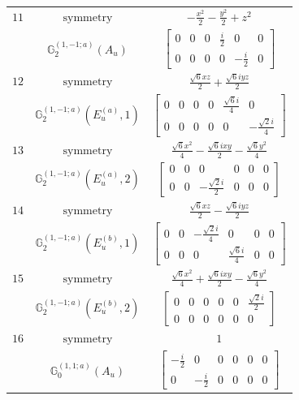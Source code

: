 \documentclass[fleqn,8pt,landscape]{jsarticle}
\begin{document}
\begin{longtable}{ccc}
$ 11 $ & $ \text{symmetry} $ & $ - \frac{x^{2}}{2} - \frac{y^{2}}{2} + z^{2} $ \\
$  $ & $ \mathbb{G}_{2}^{(1,-1;a)}(A_{u}) $ & $ \begin{bmatrix} 0 & 0 & 0 & \frac{i}{2} & 0 & 0 \\ 0 & 0 & 0 & 0 & - \frac{i}{2} & 0 \end{bmatrix} $ \\ \hline
$ 12 $ & $ \text{symmetry} $ & $ \frac{\sqrt{6} x z}{2} + \frac{\sqrt{6} i y z}{2} $ \\
$  $ & $ \mathbb{G}_{2}^{(1,-1;a)}(E_{u}^{(a)},1) $ & $ \begin{bmatrix} 0 & 0 & 0 & 0 & \frac{\sqrt{6} i}{4} & 0 \\ 0 & 0 & 0 & 0 & 0 & - \frac{\sqrt{2} i}{4} \end{bmatrix} $ \\ \hline
$ 13 $ & $ \text{symmetry} $ & $ \frac{\sqrt{6} x^{2}}{4} - \frac{\sqrt{6} i x y}{2} - \frac{\sqrt{6} y^{2}}{4} $ \\
$  $ & $ \mathbb{G}_{2}^{(1,-1;a)}(E_{u}^{(a)},2) $ & $ \begin{bmatrix} 0 & 0 & 0 & 0 & 0 & 0 \\ 0 & 0 & - \frac{\sqrt{2} i}{2} & 0 & 0 & 0 \end{bmatrix} $ \\ \hline
$ 14 $ & $ \text{symmetry} $ & $ \frac{\sqrt{6} x z}{2} - \frac{\sqrt{6} i y z}{2} $ \\
$  $ & $ \mathbb{G}_{2}^{(1,-1;a)}(E_{u}^{(b)},1) $ & $ \begin{bmatrix} 0 & 0 & - \frac{\sqrt{2} i}{4} & 0 & 0 & 0 \\ 0 & 0 & 0 & \frac{\sqrt{6} i}{4} & 0 & 0 \end{bmatrix} $ \\ \hline
$ 15 $ & $ \text{symmetry} $ & $ \frac{\sqrt{6} x^{2}}{4} + \frac{\sqrt{6} i x y}{2} - \frac{\sqrt{6} y^{2}}{4} $ \\
$  $ & $ \mathbb{G}_{2}^{(1,-1;a)}(E_{u}^{(b)},2) $ & $ \begin{bmatrix} 0 & 0 & 0 & 0 & 0 & \frac{\sqrt{2} i}{2} \\ 0 & 0 & 0 & 0 & 0 & 0 \end{bmatrix} $ \\ \hline
$ 16 $ & $ \text{symmetry} $ & $ 1 $ \\
$  $ & $ \mathbb{G}_{0}^{(1,1;a)}(A_{u}) $ & $ \begin{bmatrix} - \frac{i}{2} & 0 & 0 & 0 & 0 & 0 \\ 0 & - \frac{i}{2} & 0 & 0 & 0 & 0 \end{bmatrix} $ \\ \hline

\end{longtable}
\end{document}
